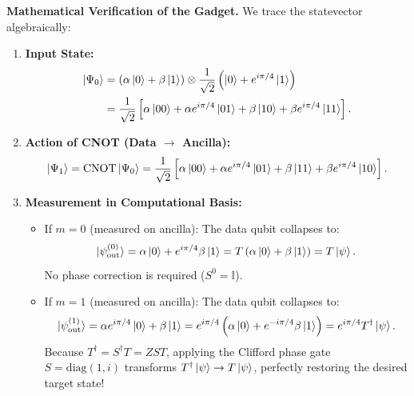 \noindent \textbf{Mathematical Verification of the Gadget.} We trace the statevector algebraically:
\begin{enumerate}
    \item \textbf{Input State:}
    \begin{align}
        \ket{\Psi_0} &= (\alpha\ket{0} + \beta\ket{1}) \otimes \frac{1}{\sqrt{2}}\left(\ket{0} + e^{i\pi/4}\ket{1}\right) \nonumber \\
        &= \frac{1}{\sqrt{2}}\left[\alpha\ket{00} + \alpha e^{i\pi/4}\ket{01} + \beta\ket{10} + \beta e^{i\pi/4}\ket{11}\right].
    \end{align}
    
    \item \textbf{Action of CNOT (Data $\to$ Ancilla):}
    \begin{equation}
        \ket{\Psi_1} = \text{CNOT}\ket{\Psi_0} = \frac{1}{\sqrt{2}}\left[\alpha\ket{00} + \alpha e^{i\pi/4}\ket{01} + \beta\ket{11} + \beta e^{i\pi/4}\ket{10}\right].
    \end{equation}
    
    \item \textbf{Measurement in Computational Basis:}
    \begin{itemize}
        \item If $m = 0$ (measured on ancilla): The data qubit collapses to:
        \begin{equation}
            \ket{\psi_{\text{out}}^{(0)}} = \alpha\ket{0} + e^{i\pi/4}\beta\ket{1} = T \left( \alpha\ket{0} + \beta\ket{1} \right) = T\ket{\psi}.
        \end{equation}
        No phase correction is required ($S^0 = \mathbb{I}$).
        \item If $m = 1$ (measured on ancilla): The data qubit collapses to:
        \begin{equation}
            \ket{\psi_{\text{out}}^{(1)}} = \alpha e^{i\pi/4}\ket{0} + \beta\ket{1} = e^{i\pi/4}\left( \alpha\ket{0} + e^{-i\pi/4}\beta\ket{1} \right) = e^{i\pi/4} T^\dagger \ket{\psi}.
        \end{equation}
        Because $T^\dagger = S^\dagger T = Z S T$, applying the Clifford phase gate $S = \text{diag}(1, i)$ transforms $T^\dagger\ket{\psi} \to T\ket{\psi}$, perfectly restoring the desired target state!
    \end{itemize}
\end{enumerate}


